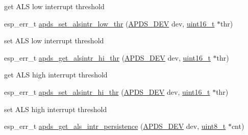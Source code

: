 \begin{DoxyCompactItemize}
\begin{DoxyCompactList}\small\item\em 
\begin{DoxyItemize}
\item get A\+LS low interrupt threshold 
\end{DoxyItemize}\end{DoxyCompactList}\item 
esp\+\_\+err\+\_\+t \hyperlink{group__APDS9960__ALSFunctions_ga2e55ac0eb17c3893d4da292ffee730ee}{apds\+\_\+set\+\_\+alsintr\+\_\+low\+\_\+thr} (\hyperlink{structAPDS9960__Driver}{A\+P\+D\+S\+\_\+\+D\+EV} dev, \hyperlink{vl53l0x__types_8h_a273cf69d639a59973b6019625df33e30}{uint16\+\_\+t} $\ast$thr)
\begin{DoxyCompactList}\small\item\em 
\begin{DoxyItemize}
\item set A\+LS low interrupt threshold 
\end{DoxyItemize}\end{DoxyCompactList}\item 
esp\+\_\+err\+\_\+t \hyperlink{group__APDS9960__ALSFunctions_ga54ea839c8b87a929450d56142685083c}{apds\+\_\+get\+\_\+alsintr\+\_\+hi\+\_\+thr} (\hyperlink{structAPDS9960__Driver}{A\+P\+D\+S\+\_\+\+D\+EV} dev, \hyperlink{vl53l0x__types_8h_a273cf69d639a59973b6019625df33e30}{uint16\+\_\+t} $\ast$thr)
\begin{DoxyCompactList}\small\item\em 
\begin{DoxyItemize}
\item get A\+LS high interrupt threshold 
\end{DoxyItemize}\end{DoxyCompactList}\item 
esp\+\_\+err\+\_\+t \hyperlink{group__APDS9960__ALSFunctions_gab2e43323eca1802727570bb71bcef1cd}{apds\+\_\+set\+\_\+alsintr\+\_\+hi\+\_\+thr} (\hyperlink{structAPDS9960__Driver}{A\+P\+D\+S\+\_\+\+D\+EV} dev, \hyperlink{vl53l0x__types_8h_a273cf69d639a59973b6019625df33e30}{uint16\+\_\+t} $\ast$thr)
\begin{DoxyCompactList}\small\item\em 
\begin{DoxyItemize}
\item set A\+LS high interrupt threshold 
\end{DoxyItemize}\end{DoxyCompactList}\item 
esp\+\_\+err\+\_\+t \hyperlink{group__APDS9960__ALSFunctions_ga4831a3f5cec693f908b0f5a44d41c4da}{apds\+\_\+get\+\_\+als\+\_\+intr\+\_\+persistence} (\hyperlink{structAPDS9960__Driver}{A\+P\+D\+S\+\_\+\+D\+EV} dev, \hyperlink{vl53l0x__types_8h_aba7bc1797add20fe3efdf37ced1182c5}{uint8\+\_\+t} $\ast$cnt)

\end{DoxyCompactItemize}
